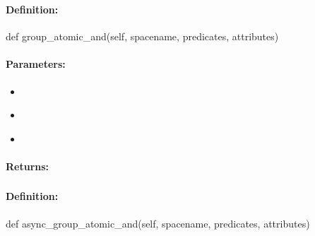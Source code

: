 \pagebreak
\subsubsection{}
\label{api:python:group_atomic_and}


\paragraph{Definition:}
\begin{pythoncode}
def group_atomic_and(self, spacename, predicates, attributes)
\end{pythoncode}

\paragraph{Parameters:}
\begin{itemize}[noitemsep]
\item {}\\

\item {}\\

\item {}\\

\end{itemize}

\paragraph{Returns:}


\pagebreak
\subsubsection{}
\label{api:python:async_group_atomic_and}


\paragraph{Definition:}
\begin{pythoncode}
def async_group_atomic_and(self, spacename, predicates, attributes)
\end{pythoncode}

